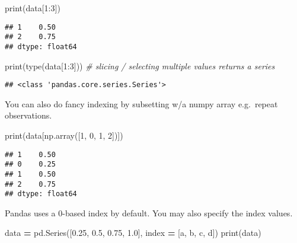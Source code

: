 \documentclass[
]{book}
\newenvironment{Shaded}{\begin{snugshade}}{\end{snugshade}}
\newcommand{\BuiltInTok}[1]{#1}
\newcommand{\CommentTok}[1]{\textcolor[rgb]{0.56,0.35,0.01}{\textit{#1}}}
\newcommand{\DecValTok}[1]{\textcolor[rgb]{0.00,0.00,0.81}{#1}}
\newcommand{\FloatTok}[1]{\textcolor[rgb]{0.00,0.00,0.81}{#1}}
\newcommand{\NormalTok}[1]{#1}
\newcommand{\OperatorTok}[1]{\textcolor[rgb]{0.81,0.36,0.00}{\textbf{#1}}}
\newcommand{\StringTok}[1]{\textcolor[rgb]{0.31,0.60,0.02}{#1}}
\begin{document}
\begin{Shaded}
\begin{Highlighting}[]
\BuiltInTok{print}\NormalTok{(data[}\DecValTok{1}\NormalTok{:}\DecValTok{3}\NormalTok{])}
\end{Highlighting}
\end{Shaded}

\begin{verbatim}
## 1    0.50
## 2    0.75
## dtype: float64
\end{verbatim}

\begin{Shaded}
\begin{Highlighting}[]
\BuiltInTok{print}\NormalTok{(}\BuiltInTok{type}\NormalTok{(data[}\DecValTok{1}\NormalTok{:}\DecValTok{3}\NormalTok{])) }\CommentTok{\# slicing / selecting multiple values returns a series}
\end{Highlighting}
\end{Shaded}

\begin{verbatim}
## <class 'pandas.core.series.Series'>
\end{verbatim}

You can also do fancy indexing by subsetting w/a numpy array e.g.~repeat observations.

\begin{Shaded}
\begin{Highlighting}[]
\BuiltInTok{print}\NormalTok{(data[np.array([}\DecValTok{1}\NormalTok{, }\DecValTok{0}\NormalTok{, }\DecValTok{1}\NormalTok{, }\DecValTok{2}\NormalTok{])])}
\end{Highlighting}
\end{Shaded}

\begin{verbatim}
## 1    0.50
## 0    0.25
## 1    0.50
## 2    0.75
## dtype: float64
\end{verbatim}

Pandas uses a 0-based index by default. You may also specify the index values.

\begin{Shaded}
\begin{Highlighting}[]
\NormalTok{data }\OperatorTok{=}\NormalTok{ pd.Series([}\FloatTok{0.25}\NormalTok{, }\FloatTok{0.5}\NormalTok{, }\FloatTok{0.75}\NormalTok{, }\FloatTok{1.0}\NormalTok{],}
\NormalTok{index }\OperatorTok{=}\NormalTok{ [}\StringTok{\textquotesingle{}a\textquotesingle{}}\NormalTok{, }\StringTok{\textquotesingle{}b\textquotesingle{}}\NormalTok{, }\StringTok{\textquotesingle{}c\textquotesingle{}}\NormalTok{, }\StringTok{\textquotesingle{}d\textquotesingle{}}\NormalTok{])}
\BuiltInTok{print}\NormalTok{(data)}
\end{Highlighting}
\end{Shaded}
\end{document}
